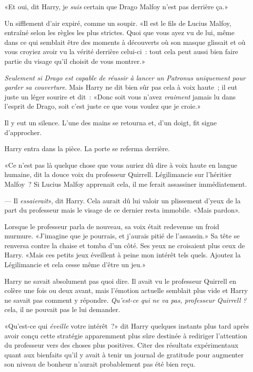 «Et oui, dit Harry, je \emph{suis} certain que Drago Malfoy n'est pas derrière ça.»

Un sifflement d'air expiré, comme un soupir. «Il est le fils de Lucius Malfoy, entraîné selon les règles les plus strictes. Quoi que vous ayez vu de lui, même dans ce qui semblait être des moments à découverts où son masque glissait et où vous croyiez avoir vu la vérité derrière celui-ci~: tout cela peut aussi bien faire partie du visage qu'il choisit de vous montrer.»

\emph{Seulement si Drago est capable de réussir à lancer un Patronus uniquement pour garder sa couverture}. Mais Harry ne dit bien sûr pas cela à voix haute~; il eut juste un léger sourire et dit~: «Donc soit vous n'avez \emph{vraiment} jamais lu dans l'esprit de Drago, soit c'est juste ce que vous voulez que je croie.»

Il y eut un silence. L'une des mains se retourna et, d'un doigt, fit signe d'approcher.

Harry entra dans la pièce. La porte se referma derrière.

«Ce n'est pas là quelque chose que vous auriez dû dire à voix haute en langue humaine, dit la douce voix du professeur Quirrell. Légilimancie sur l'héritier Malfoy~? Si Lucius Malfoy apprenait cela, il me ferait assassiner immédiatement.

--- Il \emph{essaierait}», dit Harry. Cela aurait dû lui valoir un plissement d'yeux de la part du professeur mais le visage de ce dernier resta immobile. «Mais pardon».

Lorsque le professeur parla de nouveau, sa voix était redevenue un froid murmure. «J'imagine que je pourrais, et j'aurais pitié de l'assassin.» Sa tête se renversa contre la chaise et tomba d'un côté. Ses yeux ne croisaient plus ceux de Harry. «Mais ces petits jeux éveillent à peine mon intérêt tels quels. Ajoutez la Légilimancie et cela cesse même d'être un jeu.»

Harry ne savait absolument pas quoi dire. Il avait vu le professeur Quirrell en colère une fois ou deux avant, mais l'émotion actuelle semblait plus vide et Harry ne savait pas comment y répondre. \emph{Qu'est-ce qui ne va pas, professeur Quirrell} \emph{?} cela, il ne pouvait pas le lui demander.

«Qu'est-ce qui \emph{éveille} votre intérêt~?» dit Harry quelques instants plus tard après avoir conçu cette stratégie apparemment plus sûre destinée à rediriger l'attention du professeur vers des choses plus positives. Citer des résultats expérimentaux quant aux bienfaits qu'il y avait à tenir un journal de gratitude pour augmenter son niveau de bonheur n'aurait probablement pas été bien reçu.

